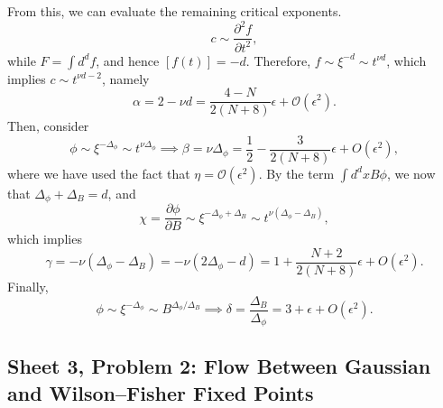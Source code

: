 \begin{solution}
\begin{equation}
    \end{equation}
    From this, we can evaluate the remaining critical exponents.
    \begin{equation}
        c \sim \frac{\partial^2 f}{\partial t^2},
    \end{equation}
    while $F = \int d^d f$, and hence $[f(t)] = -d$. Therefore, $f \sim \xi^{-d} \sim t^{\nu d}$, which implies $c\sim t^{\nu d -2}$, namely
    \begin{equation}
        \alpha = 2-\nu d = \frac{4-N}{2(N+8)}\epsilon + \mathcal{O}(\epsilon^2).
    \end{equation}
    Then, consider
    \begin{equation}
        \phi \sim \xi^{-\Delta_\phi} \sim t^{\nu \Delta_\phi} \implies \beta = \nu \Delta_\phi =
\frac12-\frac{3}{2(N+8)}\epsilon
+O(\epsilon^2),
    \end{equation}
    where we have used the fact that $\eta = \mathcal{O}(\epsilon^2)$.
    By the term $\int d^dx B\phi$, we now that $\Delta_\phi + \Delta_B = d$, and
    \begin{equation}
        \chi = \frac{\partial \phi}{\partial B} \sim \xi^{-\Delta_\phi   + \Delta_B}\sim t^{\nu(\Delta_\phi -\Delta_B)},
    \end{equation}
    which implies
    \begin{equation}
        \gamma = -\nu(\Delta_\phi -\Delta_B) = -\nu(2\Delta_\phi-d) =
1+\frac{N+2}{2(N+8)}\epsilon
+O(\epsilon^2)
.
    \end{equation}
    Finally,
    \begin{equation}
        \phi \sim \xi^{-\Delta_\phi} \sim B^{\Delta_\phi/\Delta_B} \implies \delta = \frac{\Delta_B}{\Delta_\phi} = 3+\epsilon+O(\epsilon^2).
    \end{equation}

\end{solution}

\subsection{Sheet 3, Problem 2: Flow Between Gaussian and Wilson--Fisher Fixed Points}

